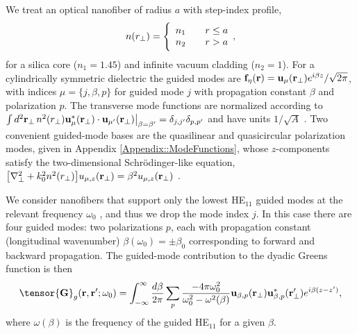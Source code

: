 \documentclass[aps,pra,twocolumn]{revtex4-1} %
\newcommand{\fidx}{\eta}
\newcommand{\eigenf}{\mbf{f}_\fidx}
\begin{document}
We treat an optical nanofiber of radius $a$ with step-index profile,
	\begin{align} \label{Eq::IndexofRefraction}
		n(r_\perp) = \Bigg\{  
			\begin{array}{l l} n_1 & \quad r \leq a \\
						 n_2 & \quad r > a 
		\end{array},
	\end{align}
for a silica core ($n_1 = 1.45$) and infinite vacuum cladding ($n_2 = 1$).  For a cylindrically symmetric dielectric the guided modes are $\eigenf (\br) = \mathbf{u}_\mu (\br_\perp) e^{i\beta z}/\sqrt{2 \pi}$, with indices $\mu=\{j, \beta, p\}$ for guided mode $j$ with propagation constant $\beta$ and polarization $p$.  The transverse mode functions are normalized according to $\int d^2 \mathbf{r}_\perp \, n^2(r_\perp)\mathbf{u}^*_\mu (\mathbf{r}_\perp) \cdot \mathbf{u}_{\mu'} (\mathbf{r}_\perp)\big|_{\beta = \beta'} = \delta_{j,j'}\delta_{p,p'}$ and have units $1/\sqrt{A}$ \cite{le_kien_anisotropy_2014}.  Two convenient guided-mode bases are the quasilinear and quasicircular polarization modes, given in  Appendix \ref{Appendix::ModeFunctions}, whose $z$-components satisfy the two-dimensional Schr\"{o}dinger-like equation, $\big[\nabla_\perp^2 +k_0^2 n^2(r_\perp) \big] u_{\mu,z} (\mathbf{r}_\perp) = \beta^2 u_{\mu,z} (\mathbf{r}_\perp)$ \cite{kien_field_2004}.  

We consider nanofibers that support only the lowest HE$_{11}$ guided modes at the relevant frequency $\omega_0$ \cite{snyder_optical_1983}, and thus we drop the mode index $j$.  In this case there are four guided modes: two polarizations $p$, each with propagation constant (longitudinal wavenumber) $\beta(\omega_0) = \pm\beta_0$ corresponding to forward and backward propagation.  The guided-mode contribution to the dyadic Greens function is then 
	\begin{equation} \label{Eq::GreensEigenmodes}
		\tensor{\mathbf{G}}_g(\br,\br'; \omega_0) = \int_{-\infty}^\infty \frac{d \beta}{2 \pi} \sum_{p} 
\frac{-4\pi\omega_0^2}{\omega_0^2-\omega^2(\beta)} \mathbf{u}_{\beta,p} (\br_\perp)\mathbf{u}^*_{\beta,p} 
(\br_{\perp}^\prime) e^{i\beta(z-z')},
	\end{equation}
where $ \omega(\beta)$ is the frequency of the guided HE$_{11}$ for a given $\beta$.  
\end{document}
